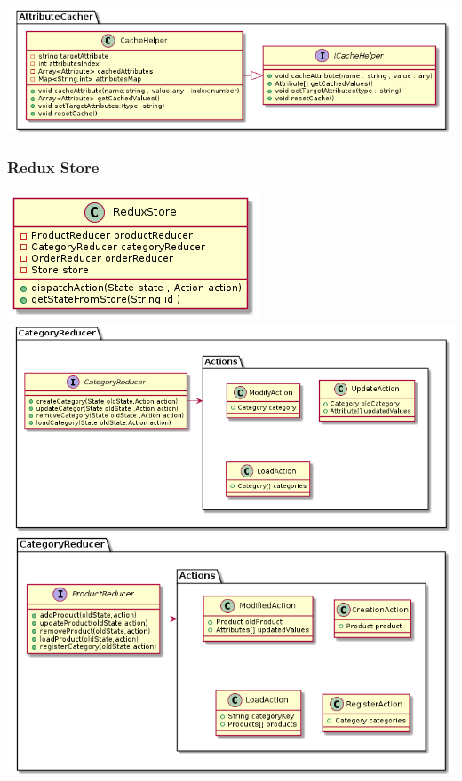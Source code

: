 \documentclass{article}
\begin{document}
\includegraphics[scale=0.5]{./out/ReactApp/Application/AttributeCacher/AttributeCacher.png}\\

\subsubsection{Redux Store}
\includegraphics[scale=0.5]{./out/ReactApp/Application/ReduxStore/Store.png}\\
\includegraphics[scale=0.5]{./out/ReactApp/Application/ProductReducer/ProductReducer.png}\\
\includegraphics[scale=0.5]{./out/ReactApp/Application/CategoryReducer/CategoryReducer.png}\\
\end{document}
